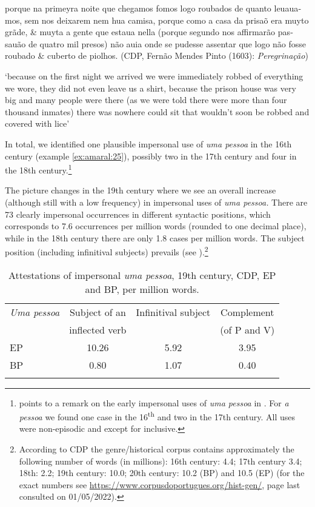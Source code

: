 \documentclass[output=paper]{langscibook}
\begin{document}
\eanoraggedright\label{ex:amaral:26}
\begin{otherlanguage}{portuguese}
porque na primeyra noite que chegamos fomos logo roubados de quanto leuauamos, sem nos deixarem nem hua camisa, porque como a casa da prisaõ era muyto grãde, \& muyta a gente que estaua nella (porque segundo nos affirmarão passauão de quatro mil presos) não auia onde  se pudesse assentar que logo não fosse roubado \& cuberto de piolhos. (CDP, Fernão Mendes Pinto (1603): \textit{Peregrinação})
\end{otherlanguage}
\glt ‘because on the first night we arrived we were immediately robbed of everything we wore, they did not even leave us a shirt, because the prison house was very big and many people were there (as we were told there were more than four thousand inmates) there was nowhere  could sit that wouldn’t soon be robbed and covered with lice’
\z 


In total, we identified one plausible impersonal use of {\textit{uma pessoa}} in the 16th century (example \ref{ex:amaral:25}), possibly two in the 17th century and four in the 18th century.\footnote{\citet{Posio2021} points to a remark on the early impersonal uses of \textit{uma pessoa} in \citet{Nunes1919}. For \textit{a pessoa} we found one case in the 16\textsuperscript{th} and two in the 17th century. All uses were non-episodic and except for  inclusive.}



The picture changes in the 19th century where we see an overall increase (although still with a low frequency) in impersonal uses of \textit{uma pessoa.} There are 73 clearly impersonal occurrences in different syntactic positions, which corresponds to 7.6 occurrences per million words (rounded to one decimal place), while in the 18th century there are only 1.8 cases per million words. The subject position (including infinitival subjects) prevails (see ).\footnote{According to CDP the genre/historical corpus contains approximately the following number of words (in millions): 16th century: 4.4; 17th century 3.4; 18th: 2.2; 19th century: 10.0; 20th century: 10.2 (BP) and 10.5 (EP) (for the exact numbers see \url{https://www.corpusdoportugues.org/hist-gen/}, page last consulted on 01/05/2022).}


\begin{table}
\begin{tabular}{l *3{S[table-format=2.2]}}
\lsptoprule
{\itshape Uma pessoa} & {Subject of an } & {Infinitival subject} & {Complement}\\
& {inflected verb} & & {(of P and V)}\\
\midrule
EP & 10.26 & 5.92 & 3.95\\
BP & 0.80  & 1.07 & 0.40\\
\lspbottomrule
\end{tabular}
\caption{Attestations of impersonal \textit{uma pessoa}, 19th century, CDP, EP and BP, per million words.\label{tab:amaral:3}}
\end{table}
\end{document}
